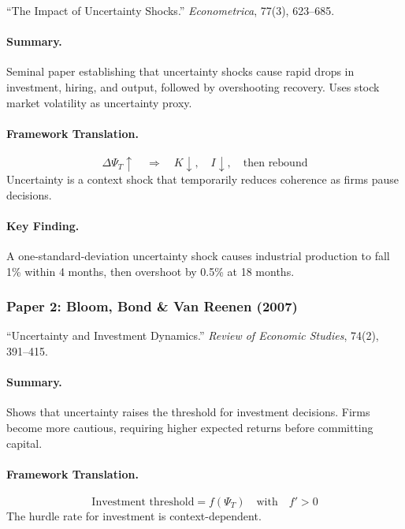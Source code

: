 \documentclass[12pt,a4paper]{article}
\begin{document}
``The Impact of Uncertainty Shocks.''
\textit{Econometrica}, 77(3), 623--685.

\paragraph{Summary.}
Seminal paper establishing that uncertainty shocks cause rapid drops in investment,
hiring, and output, followed by overshooting recovery. Uses stock market volatility
as uncertainty proxy.

\paragraph{Framework Translation.}
\begin{equation}
  \Delta \Psi_T \uparrow \quad \Rightarrow \quad K \downarrow, \quad I \downarrow, \quad \text{then rebound}
\end{equation}
Uncertainty is a context shock that temporarily reduces coherence as firms pause decisions.

\paragraph{Key Finding.}
A one-standard-deviation uncertainty shock causes industrial production to fall 1\%
within 4 months, then overshoot by 0.5\% at 18 months.

\subsubsection{Paper 2: Bloom, Bond \& Van Reenen (2007)}

``Uncertainty and Investment Dynamics.''
\textit{Review of Economic Studies}, 74(2), 391--415.

\paragraph{Summary.}
Shows that uncertainty raises the threshold for investment decisions. Firms become
more cautious, requiring higher expected returns before committing capital.

\paragraph{Framework Translation.}
\begin{equation}
  \text{Investment threshold} = f(\Psi_T) \quad \text{with} \quad f' > 0
\end{equation}
The hurdle rate for investment is context-dependent.
\end{document}
